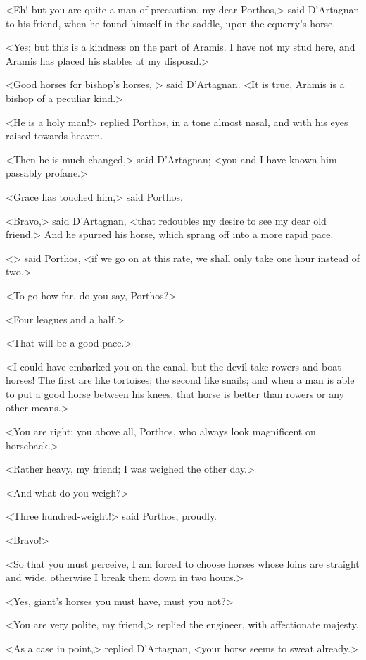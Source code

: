 <Eh! but you are quite a man of precaution, my dear Porthos,> said D'Artagnan to his friend, when he found himself in the saddle, upon the equerry's horse.

<Yes; but this is a kindness on the part of Aramis. I have not my stud here, and Aramis has placed his stables at my disposal.>

<Good horses for bishop's horses, > said D'Artagnan. <It is true, Aramis is a bishop of a peculiar kind.>

<He is a holy man!> replied Porthos, in a tone almost nasal, and with his eyes raised towards heaven.

<Then he is much changed,> said D'Artagnan; <you and I have known him passably profane.>

<Grace has touched him,> said Porthos.

<Bravo,> said D'Artagnan, <that redoubles my desire to see my dear old friend.> And he spurred his horse, which sprang off into a more rapid pace.

<> said Porthos, <if we go on at this rate, we shall only take one hour instead of two.>

<To go how far, do you say, Porthos?>

<Four leagues and a half.>

<That will be a good pace.>

<I could have embarked you on the canal, but the devil take rowers and boat-horses! The first are like tortoises; the second like snails; and when a man is able to put a good horse between his knees, that horse is better than rowers or any other means.>

<You are right; you above all, Porthos, who always look magnificent on horseback.>

<Rather heavy, my friend; I was weighed the other day.>

<And what do you weigh?>

<Three hundred-weight!> said Porthos, proudly.

<Bravo!>

<So that you must perceive, I am forced to choose horses whose loins are straight and wide, otherwise I break them down in two hours.>

<Yes, giant's horses you must have, must you not?>

<You are very polite, my friend,> replied the engineer, with affectionate majesty.

<As a case in point,> replied D'Artagnan, <your horse seems to sweat already.>

